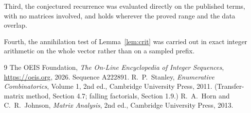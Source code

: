 \documentclass[11pt,a4paper]{article}
\theoremstyle{plain}
\theoremstyle{definition}
\begin{document}
Third, the conjectured recurrence was evaluated directly on the published terms, with no
matrices involved, and holds wherever the proved range and the data overlap.

Fourth, the annihilation test of Lemma~\ref{lem:crit} was carried out in exact integer
arithmetic on the whole vector rather than on a sampled prefix.

\begin{thebibliography}{9}
 The OEIS Foundation, \emph{The On-Line Encyclopedia of Integer
Sequences}, \url{https://oeis.org}, 2026. Sequence A222891.
 R.~P.~Stanley, \emph{Enumerative Combinatorics}, Volume 1, 2nd ed.,
Cambridge University Press, 2011. (Transfer-matrix method, Section 4.7; falling factorials,
Section 1.9.)
 R.~A.~Horn and C.~R.~Johnson, \emph{Matrix Analysis}, 2nd ed., Cambridge
University Press, 2013.
\end{thebibliography}
\end{document}
